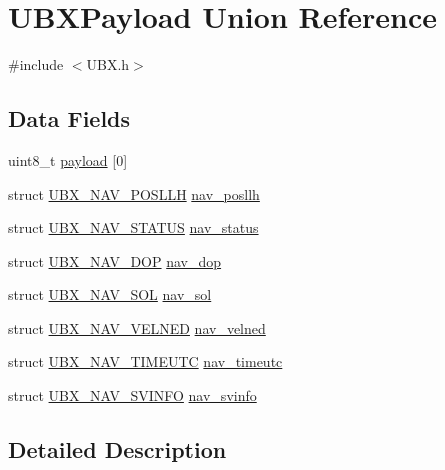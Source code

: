 \hypertarget{union_u_b_x_payload}{\section{\-U\-B\-X\-Payload \-Union \-Reference}
\label{union_u_b_x_payload}
}


{\ttfamily \#include $<$\-U\-B\-X.\-h$>$}

\subsection*{\-Data \-Fields}
\begin{DoxyCompactItemize}
\item 
uint8\-\_\-t \hyperlink{union_u_b_x_payload_a1aaa9f05bb8d9cec08462c71aedeb224}{payload} \mbox{[}0\mbox{]}
\item 
struct \hyperlink{struct_u_b_x___n_a_v___p_o_s_l_l_h}{\-U\-B\-X\-\_\-\-N\-A\-V\-\_\-\-P\-O\-S\-L\-L\-H} \hyperlink{union_u_b_x_payload_ac43eeda1b5ade727f5856e57ae8d4fdb}{nav\-\_\-posllh}
\item 
struct \hyperlink{struct_u_b_x___n_a_v___s_t_a_t_u_s}{\-U\-B\-X\-\_\-\-N\-A\-V\-\_\-\-S\-T\-A\-T\-U\-S} \hyperlink{union_u_b_x_payload_a10f246cbf1341ebaca17da26a61eb344}{nav\-\_\-status}
\item 
struct \hyperlink{struct_u_b_x___n_a_v___d_o_p}{\-U\-B\-X\-\_\-\-N\-A\-V\-\_\-\-D\-O\-P} \hyperlink{union_u_b_x_payload_aabf42aafbe0f26fe6224cd255ddfcbd3}{nav\-\_\-dop}
\item 
struct \hyperlink{struct_u_b_x___n_a_v___s_o_l}{\-U\-B\-X\-\_\-\-N\-A\-V\-\_\-\-S\-O\-L} \hyperlink{union_u_b_x_payload_aba19134cfa2bf927f5ae568a4d1fa82f}{nav\-\_\-sol}
\item 
struct \hyperlink{struct_u_b_x___n_a_v___v_e_l_n_e_d}{\-U\-B\-X\-\_\-\-N\-A\-V\-\_\-\-V\-E\-L\-N\-E\-D} \hyperlink{union_u_b_x_payload_ae525d323fa4053d1f5441bae99d81a95}{nav\-\_\-velned}
\item 
struct \hyperlink{struct_u_b_x___n_a_v___t_i_m_e_u_t_c}{\-U\-B\-X\-\_\-\-N\-A\-V\-\_\-\-T\-I\-M\-E\-U\-T\-C} \hyperlink{union_u_b_x_payload_af65229991956493628326aa718c2e156}{nav\-\_\-timeutc}
\item 
struct \hyperlink{struct_u_b_x___n_a_v___s_v_i_n_f_o}{\-U\-B\-X\-\_\-\-N\-A\-V\-\_\-\-S\-V\-I\-N\-F\-O} \hyperlink{union_u_b_x_payload_ae82725b3f4df8d06429de80876bd7bb4}{nav\-\_\-svinfo}
\end{DoxyCompactItemize}


\subsection{\-Detailed \-Description}


